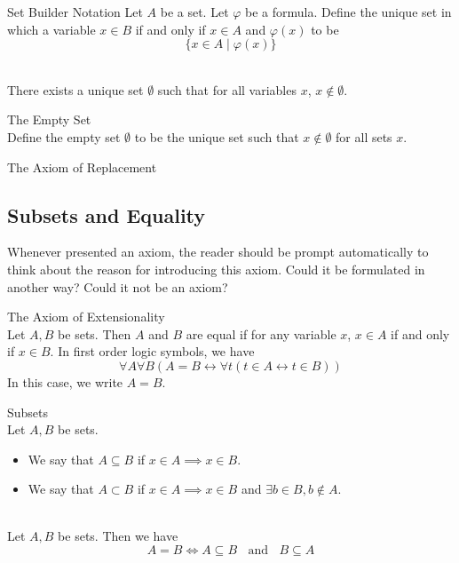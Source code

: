 \documentclass[a4paper]{article}
\begin{document}
\begin{defn}{Set Builder Notation}{} Let $A$ be a set. Let $\varphi$ be a formula. Define the unique set in which a variable $x\in B$ if and only if $x\in A$ and $\varphi(x)$ to be $$\{x\in A\;|\;\varphi(x)\}$$
\end{defn}

\begin{prp}{}{}\\
There exists a unique set $\emptyset$ such that for all variables $x$, $x\notin\emptyset$. 
\end{prp}

\begin{defn}{The Empty Set}{}\\
Define the empty set $\emptyset$ to be the unique set such that $x\notin\emptyset$ for all sets $x$. 
\end{defn}

\begin{axm}{The Axiom of Replacement}{}
\end{axm}

\subsection{Subsets and Equality}
Whenever presented an axiom, the reader should be prompt automatically to think about the reason for introducing this axiom. Could it be formulated in another way? Could it not be an axiom? 

\begin{axm}{The Axiom of Extensionality}{}\\
Let $A,B$ be sets. Then $A$ and $B$ are equal if for any variable $x$, $x\in A$ if and only if $x\in B$. In first order logic symbols, we have $$\forall A\forall B(A=B\leftrightarrow\forall t(t\in A\leftrightarrow t\in B))$$ In this case, we write $A=B$. 
\end{axm}

\begin{defn}{Subsets}{}\\
Let $A,B$ be sets. 
\begin{itemize}
\item We say that $A\subseteq B$ if $x\in A\implies x\in B$. 
\item We say that $A\subset B$ if $x\in A\implies x\in B$ and $\exists b\in B,b\notin A$. 
\end{itemize}
\end{defn}

\begin{prp}{}{}\\
Let $A,B$ be sets. Then we have $$A=B\iff A\subseteq B\;\;\text{ and }\;\; B\subseteq A$$
\end{prp}
\end{document}
